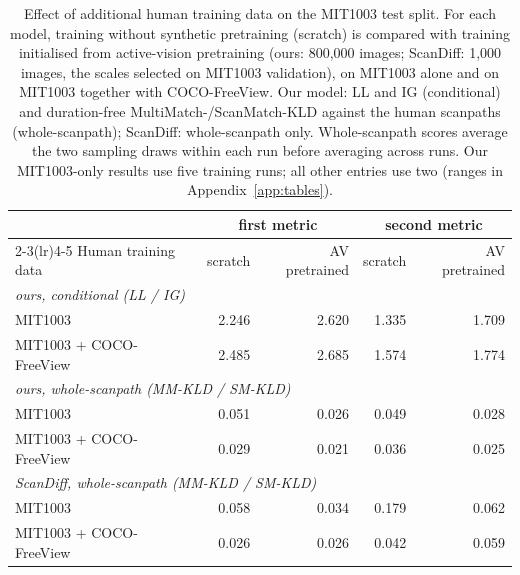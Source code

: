 \begin{table}[t]
  \centering
  \small
  \begin{tabular}{lrrrr}
    \toprule
    & \multicolumn{2}{c}{first metric} & \multicolumn{2}{c}{second metric} \\
    \cmidrule(lr){2-3}\cmidrule(lr){4-5}
    Human training data & scratch & AV pretrained & scratch & AV pretrained \\
    \midrule
    \multicolumn{5}{l}{\emph{ours, conditional (LL / IG)}} \\
    MIT1003 & 2.246 & 2.620 & 1.335 & 1.709 \\
    MIT1003 + COCO-FreeView & 2.485 & 2.685 & 1.574 & 1.774 \\
    \midrule
    \multicolumn{5}{l}{\emph{ours, whole-scanpath (MM-KLD / SM-KLD)}} \\
    MIT1003 & 0.051 & 0.026 & 0.049 & 0.028 \\
    MIT1003 + COCO-FreeView & 0.029 & 0.021 & 0.036 & 0.025 \\
    \midrule
    \multicolumn{5}{l}{\emph{ScanDiff, whole-scanpath (MM-KLD / SM-KLD)}} \\
    MIT1003 & 0.058 & 0.034 & 0.179 & 0.062 \\
    MIT1003 + COCO-FreeView & 0.026 & 0.026 & 0.042 & 0.059 \\
    \bottomrule
  \end{tabular}
  \caption{Effect of additional human training data on the MIT1003 test split. For each model, training without synthetic pretraining (scratch) is compared with training initialised from active-vision pretraining (ours: 800,000 images; ScanDiff: 1,000 images, the scales selected on MIT1003 validation), on MIT1003 alone and on MIT1003 together with COCO-FreeView. Our model: LL and IG (conditional) and duration-free MultiMatch-/ScanMatch-KLD against the human scanpaths (whole-scanpath); ScanDiff: whole-scanpath only. Whole-scanpath scores average the two sampling draws within each run before averaging across runs. Our MIT1003-only results use five training runs; all other entries use two (ranges in Appendix~\ref{app:tables}).}
  \label{tab:additional-data}
\end{table}

